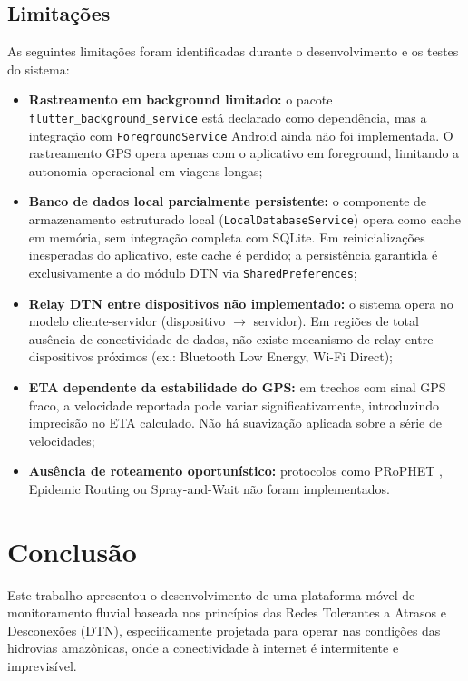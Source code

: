 \documentclass[12pt]{article}
\begin{document}
\subsection{Limitações}

As seguintes limitações foram identificadas durante o desenvolvimento e os testes do sistema:

\begin{itemize}
\item \textbf{Rastreamento em background limitado:} o pacote \texttt{flutter\_background\_service} está declarado como dependência, mas a integração com \texttt{ForegroundService} Android ainda não foi implementada. O rastreamento GPS opera apenas com o aplicativo em foreground, limitando a autonomia operacional em viagens longas;

\item \textbf{Banco de dados local parcialmente persistente:} o componente de armazenamento estruturado local (\texttt{LocalDatabaseService}) opera como cache em memória, sem integração completa com SQLite. Em reinicializações inesperadas do aplicativo, este cache é perdido; a persistência garantida é exclusivamente a do módulo DTN via \texttt{SharedPreferences};

\item \textbf{Relay DTN entre dispositivos não implementado:} o sistema opera no modelo cliente-servidor (dispositivo $\rightarrow$ servidor). Em regiões de total ausência de conectividade de dados, não existe mecanismo de relay entre dispositivos próximos (ex.: Bluetooth Low Energy, Wi-Fi Direct);

\item \textbf{ETA dependente da estabilidade do GPS:} em trechos com sinal GPS fraco, a velocidade reportada pode variar significativamente, introduzindo imprecisão no ETA calculado. Não há suavização aplicada sobre a série de velocidades;

\item \textbf{Ausência de roteamento oportunístico:} protocolos como PRoPHET \cite{lindgren2003prophet}, Epidemic Routing \cite{vahdat2000epidemic} ou Spray-and-Wait \cite{spyropoulos2005spray} não foram implementados.
\end{itemize}

\section{Conclusão}
Este trabalho apresentou o desenvolvimento de uma plataforma móvel de monitoramento fluvial baseada nos princípios das Redes Tolerantes a Atrasos e Desconexões (DTN), especificamente projetada para operar nas condições das hidrovias amazônicas, onde a conectividade à internet é intermitente e imprevisível.
\end{document}
